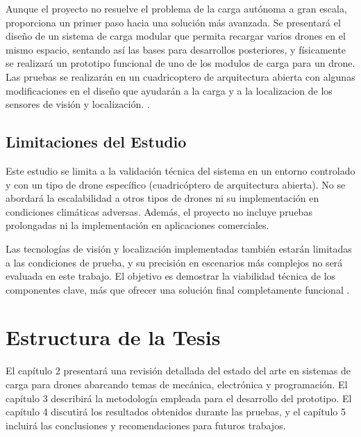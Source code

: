 Aunque el proyecto no resuelve el problema de la carga autónoma a gran escala, proporciona un primer paso hacia una solución más avanzada. Se presentará el diseño de un sistema de carga modular que permita recargar varios drones en el mismo espacio, sentando así las bases para desarrollos posteriores, y físicamente se realizará un prototipo funcional de uno de los modulos de carga para un drone. Las pruebas se realizarán en un cuadricoptero de arquitectura abierta con algunas modificaciones en el diseño que ayudarán a la carga y a la localizacion de los sensores de visión y localización. \cite{cite3}.

\subsection{Limitaciones del Estudio}

Este estudio se limita a la validación técnica del sistema en un entorno controlado y con un tipo de drone específico (cuadricóptero de arquitectura abierta). No se abordará la escalabilidad a otros tipos de drones ni su implementación en condiciones climáticas adversas. Además, el proyecto no incluye pruebas prolongadas ni la implementación en aplicaciones comerciales.

Las tecnologías de visión y localización implementadas también estarán limitadas a las condiciones de prueba, y su precisión en escenarios más complejos no será evaluada en este trabajo. El objetivo es demostrar la viabilidad técnica de los componentes clave, más que ofrecer una solución final completamente funcional \cite{cite4}.

\section{Estructura de la Tesis}

El capítulo 2 presentará una revisión detallada del estado del arte en sistemas de carga para drones abarcando temas de mecánica, electrónica y programación. El capítulo 3 describirá la metodología empleada para el desarrollo del prototipo. El capítulo 4 discutirá los resultados obtenidos durante las pruebas, y el capítulo 5 incluirá las conclusiones y recomendaciones para futuros trabajos.


